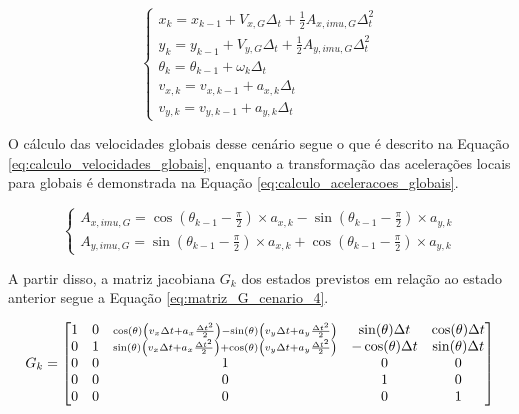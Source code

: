 \documentclass[acronym, symbols, table, deposito]{fei}
\begin{document}
			\begin{equation}\label{eq:predicao_cenario_4}
				\begin{cases}
					x_{k} = x_{k-1} + V_{x,G} \Delta_t + \frac{1}{2}A_{x,imu,G} \Delta_t^2 \\
					y_{k} = y_{k-1} + V_{y,G} \Delta_t + \frac{1}{2}A_{y,imu,G} \Delta_t^2 \\
					\theta_{k} = \theta_{k-1} + \omega_{k} \Delta_t \\
					v_{x,k} = v_{x,k-1} + a_{x,k} \Delta_t\\
					v_{y,k} = v_{y,k-1} + a_{y,k} \Delta_t
				\end{cases}
			\end{equation}

			O cálculo das velocidades globais desse cenário segue o que é descrito na Equação \eqref{eq:calculo_velocidades_globais}, enquanto a transformação das acelerações locais para globais é demonstrada na Equação \eqref{eq:calculo_aceleracoes_globais}.
			
			\begin{equation}\label{eq:calculo_aceleracoes_globais}
				\begin{cases}
					A_{x,imu,G} = \cos(\theta_{k-1} - \frac{\pi}{2}) \times a_{x,k} - \sin(\theta_{k-1} - \frac{\pi}{2}) \times a_{y,k} \\
					A_{y,imu,G} = \sin(\theta_{k-1} - \frac{\pi}{2}) \times a_{x,k} + \cos(\theta_{k-1} - \frac{\pi}{2}) \times a_{y,k}
				\end{cases}
			\end{equation}
		
			A partir disso, a matriz jacobiana $G_{k}$ dos estados previstos em relação ao estado anterior segue a Equação \eqref{eq:matriz_G_cenario_4}.
			
			\renewcommand{\arraystretch}{1.2}
			\begin{equation}\label{eq:matriz_G_cenario_4}
				G_k = 
				\begin{bmatrix}
					1 & 0 & 
					\smash{\scriptstyle 
						\cos(\theta)\left( v_x \Delta t + a_x \frac{\Delta t^2}{2} \right) 
						- \sin(\theta)\left( v_y \Delta t + a_y \frac{\Delta t^2}{2} \right)} 
					& \sin(\theta) \Delta t 
					& \cos(\theta) \Delta t 
					\\
					0 & 1 & 
					\smash{\scriptstyle 
						\sin(\theta)\left( v_x \Delta t + a_x \frac{\Delta t^2}{2} \right) 
						+ \cos(\theta)\left( v_y \Delta t + a_y \frac{\Delta t^2}{2} \right)} 
					& -\cos(\theta) \Delta t 
					& \sin(\theta) \Delta t 
					\\
					0 & 0 & 1 & 0 & 0 \\
					0 & 0 & 0 & 1 & 0 \\
					0 & 0 & 0 & 0 & 1 \\
				\end{bmatrix}
			\end{equation}
		
\end{document}
